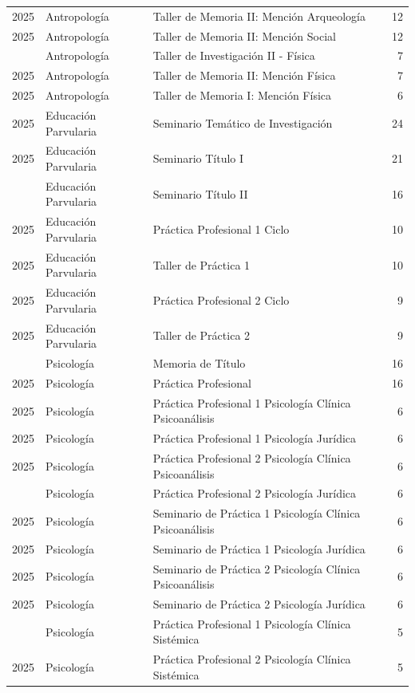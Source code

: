 \documentclass[
  spanish,
  a4paper,
  oneside]{scrbook}
\begin{document}
\begin{longtable}[t]{lllr}
2025 & Antropología & Taller de Memoria II: Mención Arqueología & 12\\
2025 & Antropología & Taller de Memoria II: Mención Social & 12\\
\addlinespace
2025 & Antropología & Taller de Investigación II - Física & 7\\
2025 & Antropología & Taller de Memoria II: Mención Física & 7\\
2025 & Antropología & Taller de Memoria I: Mención Física & 6\\
2025 & Educación Parvularia & Seminario Temático de Investigación & 24\\
2025 & Educación Parvularia & Seminario Título I & 21\\
\addlinespace
2025 & Educación Parvularia & Seminario Título II & 16\\
2025 & Educación Parvularia & Práctica Profesional 1 Ciclo & 10\\
2025 & Educación Parvularia & Taller de Práctica 1 & 10\\
2025 & Educación Parvularia & Práctica Profesional 2 Ciclo & 9\\
2025 & Educación Parvularia & Taller de Práctica 2 & 9\\
\addlinespace
2025 & Psicología & Memoria de Título & 16\\
2025 & Psicología & Práctica Profesional & 16\\
2025 & Psicología & Práctica Profesional 1 Psicología Clínica Psicoanálisis & 6\\
2025 & Psicología & Práctica Profesional 1 Psicología Jurídica & 6\\
2025 & Psicología & Práctica Profesional 2 Psicología Clínica Psicoanálisis & 6\\
\addlinespace
2025 & Psicología & Práctica Profesional 2 Psicología Jurídica & 6\\
2025 & Psicología & Seminario de Práctica 1 Psicología Clínica Psicoanálisis & 6\\
2025 & Psicología & Seminario de Práctica 1 Psicología Jurídica & 6\\
2025 & Psicología & Seminario de Práctica 2 Psicología Clínica Psicoanálisis & 6\\
2025 & Psicología & Seminario de Práctica 2 Psicología Jurídica & 6\\
\addlinespace
2025 & Psicología & Práctica Profesional 1 Psicología Clínica Sistémica & 5\\
2025 & Psicología & Práctica Profesional 2 Psicología Clínica Sistémica & 5\\

\end{longtable}
\end{document}
